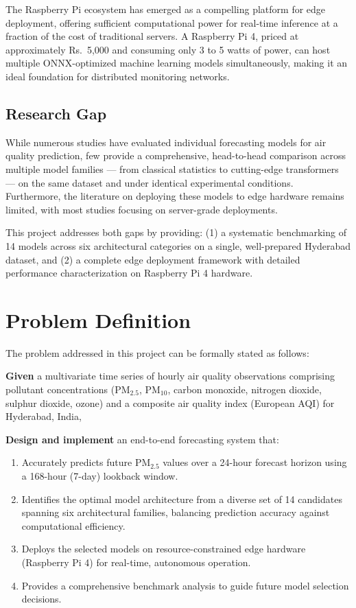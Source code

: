 The Raspberry Pi ecosystem has emerged as a compelling platform for edge deployment, offering sufficient computational power for real-time inference at a fraction of the cost of traditional servers. A Raspberry Pi 4, priced at approximately Rs.~5,000 and consuming only 3 to 5 watts of power, can host multiple ONNX-optimized machine learning models simultaneously, making it an ideal foundation for distributed monitoring networks.

\subsection{Research Gap}

While numerous studies have evaluated individual forecasting models for air quality prediction, few provide a comprehensive, head-to-head comparison across multiple model families --- from classical statistics to cutting-edge transformers --- on the same dataset and under identical experimental conditions. Furthermore, the literature on deploying these models to edge hardware remains limited, with most studies focusing on server-grade deployments.

This project addresses both gaps by providing: (1) a systematic benchmarking of 14 models across six architectural categories on a single, well-prepared Hyderabad dataset, and (2) a complete edge deployment framework with detailed performance characterization on Raspberry Pi 4 hardware.

\section{Problem Definition}

The problem addressed in this project can be formally stated as follows:

\textbf{Given} a multivariate time series of hourly air quality observations comprising pollutant concentrations (PM$_{2.5}$, PM$_{10}$, carbon monoxide, nitrogen dioxide, sulphur dioxide, ozone) and a composite air quality index (European AQI) for Hyderabad, India,

\textbf{Design and implement} an end-to-end forecasting system that:

\begin{enumerate}[label=(\alph*)]
    \item Accurately predicts future PM$_{2.5}$ values over a 24-hour forecast horizon using a 168-hour (7-day) lookback window.
    \item Identifies the optimal model architecture from a diverse set of 14 candidates spanning six architectural families, balancing prediction accuracy against computational efficiency.
    \item Deploys the selected models on resource-constrained edge hardware (Raspberry Pi 4) for real-time, autonomous operation.
    \item Provides a comprehensive benchmark analysis to guide future model selection decisions.
\end{enumerate}

